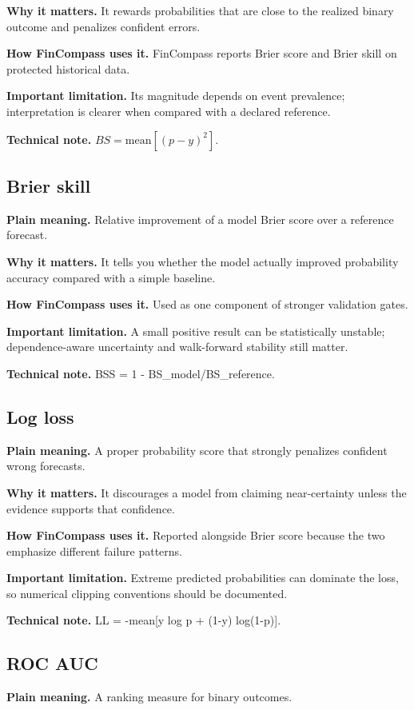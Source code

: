 \documentclass[11pt]{article}
\begin{document}
\textbf{Why it matters.} It rewards probabilities that are close to the realized binary outcome and penalizes confident errors.

\textbf{How FinCompass uses it.} FinCompass reports Brier score and Brier skill on protected historical data.

\textbf{Important limitation.} Its magnitude depends on event prevalence; interpretation is clearer when compared with a declared reference.

\textbf{Technical note.} $BS=\mathrm{mean}[(p-y)^2]$.

\subsection{Brier skill}
\textbf{Plain meaning.} Relative improvement of a model Brier score over a reference forecast.

\textbf{Why it matters.} It tells you whether the model actually improved probability accuracy compared with a simple baseline.

\textbf{How FinCompass uses it.} Used as one component of stronger validation gates.

\textbf{Important limitation.} A small positive result can be statistically unstable; dependence-aware uncertainty and walk-forward stability still matter.

\textbf{Technical note.} BSS = 1 - BS\_model/BS\_reference.

\subsection{Log loss}
\textbf{Plain meaning.} A proper probability score that strongly penalizes confident wrong forecasts.

\textbf{Why it matters.} It discourages a model from claiming near-certainty unless the evidence supports that confidence.

\textbf{How FinCompass uses it.} Reported alongside Brier score because the two emphasize different failure patterns.

\textbf{Important limitation.} Extreme predicted probabilities can dominate the loss, so numerical clipping conventions should be documented.

\textbf{Technical note.} LL = -mean[y log p + (1-y) log(1-p)].

\subsection{ROC AUC}
\textbf{Plain meaning.} A ranking measure for binary outcomes.
\end{document}
